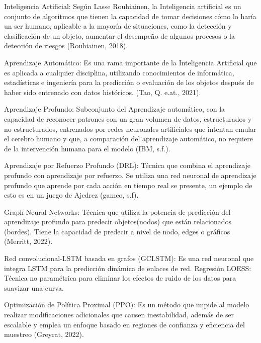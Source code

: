 Inteligencia Artificial: Según Lasse Rouhiainen, la Inteligencia artificial es un conjunto de algoritmos que tienen la capacidad de tomar decisiones cómo lo haría un ser humano, aplicable a la mayoría de situaciones, como la detección y clasificación de un objeto, aumentar el desempeño de algunos procesos o la detección de riesgos (Rouhiainen, 2018).

Aprendizaje Automático: Es una rama importante de la Inteligencia Artificial que es aplicada a cualquier disciplina, utilizando conocimientos de informática, estadísticas e ingeniería para la predicción o evaluación de los objetos después de haber sido entrenado con datos históricos. (Tao, Q. e.at., 2021).

Aprendizaje Profundo: Subconjunto del Aprendizaje automático, con la capacidad de reconocer patrones con un gran volumen de datos, estructurados y no estructurados, entrenados por redes neuronales artificiales que intentan emular el cerebro humano y que, a comparación del aprendizaje automático, no requiere de la intervención humana para el modelo (IBM, s.f.).

Aprendizaje por Refuerzo Profundo (DRL): Técnica que combina el aprendizaje profundo con aprendizaje por refuerzo. Se utiliza una red neuronal de aprendizaje profundo que aprende por cada acción en tiempo real se presente, un ejemplo de esto es en un juego de Ajedrez (gamco, s.f).

Graph Neural Networks: Técnica que utiliza la potencia de predicción del aprendizaje profundo para predecir objetos(nodos) que están relacionados (bordes). Tiene la capacidad de predecir a nivel de nodo, edges o gráficos (Merritt, 2022).

Red convolucional-LSTM basada en grafos (GCLSTM): Es una red neuronal que integra LSTM para la predicción dinámica de enlaces de red.
Regresión LOESS: Técnica no paramétrica para eliminar los efectos de ruido de los datos para suavizar una curva.

Optimización de Política Proximal (PPO): Es un método que impide al modelo realizar modificaciones adicionales que causen inestabilidad, además de ser escalable y emplea un enfoque basado en regiones de confianza y eficiencia del muestreo (Greyrat, 2022).

